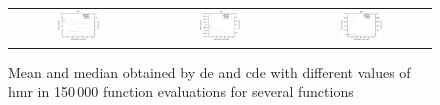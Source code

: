 \documentclass[preprint,3p]{elsarticle}
\newcommand{\CDE}{c{\sc de}}
\newcommand{\DE}{{\sc de}}
\newcommand{\HMR}{{\sc hmr}}
\begin{document}
\begin{figure}[!t]
\begin{tabular}{ccc}
  \includegraphics[width=0.32\textwidth]{images/HighMutRatio_150000/F17_50_HighMutRatio} & \includegraphics[width=0.32\textwidth]{images/HighMutRatio_150000/F18_50_HighMutRatio} & \includegraphics[width=0.32\textwidth]{images/HighMutRatio_150000/F19_50_HighMutRatio} \\ 
\end{tabular}
\caption{Mean and median obtained by \DE{} and \CDE{} with different values of \HMR{} in 150$\,$000 function evaluations for several functions}
\label{fig:exp1_1}
\end{figure}
\end{document}
